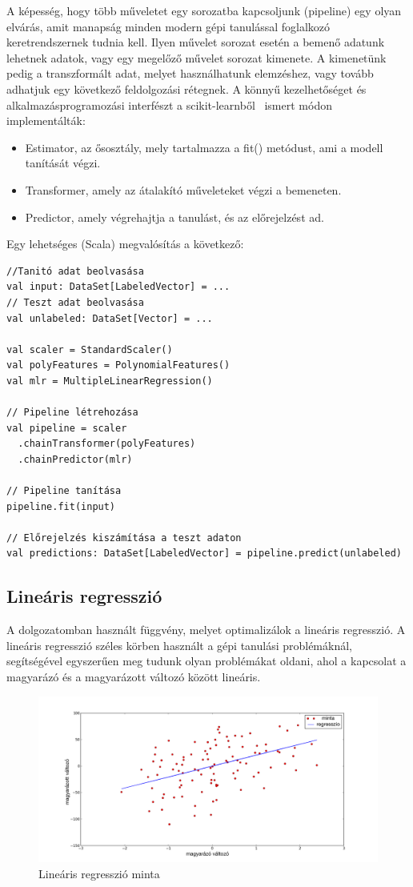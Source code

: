 \documentclass[a4paper,12pt]{article}
\begin{document}
A képesség, hogy több műveletet egy sorozatba kapcsoljunk (pipeline) egy olyan elvárás, amit manapság minden modern gépi tanulással foglalkozó keretrendszernek tudnia kell. Ilyen művelet sorozat esetén a bemenő adatunk lehetnek adatok, vagy egy megelőző művelet sorozat kimenete. A kimenetünk pedig a transzformált adat, melyet használhatunk elemzéshez, vagy tovább adhatjuk egy következő feldolgozási rétegnek.  A könnyű kezelhetőséget és alkalmazásprogramozási interfészt a scikit-learnből~\cite{sciapi} ismert módon implementálták: 
\begin{itemize}
\item Estimator, az ősosztály, mely tartalmazza a fit() metódust, ami a modell tanítását végzi.
\item Transformer, amely az átalakító műveleteket végzi a bemeneten.
\item Predictor, amely végrehajtja a tanulást, és az előrejelzést ad.
\end{itemize}

Egy lehetséges (Scala) megvalósítás a következő:

\begin{lstlisting}[style=Scala]
//Tanitó adat beolvasása
val input: DataSet[LabeledVector] = ...
// Teszt adat beolvasása
val unlabeled: DataSet[Vector] = ...

val scaler = StandardScaler()
val polyFeatures = PolynomialFeatures()
val mlr = MultipleLinearRegression()

// Pipeline létrehozása
val pipeline = scaler
  .chainTransformer(polyFeatures)
  .chainPredictor(mlr)

// Pipeline tanítása
pipeline.fit(input)

// Előrejelzés kiszámítása a teszt adaton
val predictions: DataSet[LabeledVector] = pipeline.predict(unlabeled)
\end{lstlisting}

\subsection{Lineáris regresszió}

A dolgozatomban használt függvény, melyet optimalizálok a lineáris regresszió. A lineáris regresszió széles körben használt a gépi tanulási problémáknál, segítségével egyszerűen meg tudunk olyan problémákat oldani, ahol a kapcsolat a magyarázó és a magyarázott változó között lineáris. 
\begin{figure}[H]
\centering
\includegraphics[width=130mm]{img/linreg.png}
\caption{Lineáris regresszió minta} \label{}
\end{figure}
\end{document}
